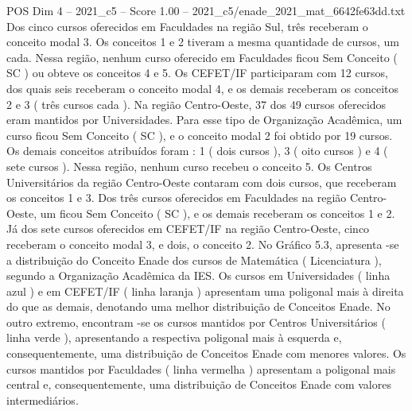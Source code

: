 \begin{textsample}{POS Dim 4 – 2021\_c5 – Score 1.00 – 2021\_c5/enade\_2021\_mat\_6642fe63dd.txt}
Dos cinco cursos oferecidos em Faculdades na região Sul, três receberam o conceito modal 3.
Os conceitos 1 e 2 tiveram a mesma quantidade de cursos, um cada.
Nessa região, nenhum curso oferecido em Faculdades ficou Sem Conceito ( SC ) ou obteve os conceitos 4 e 5.
Os CEFET/IF participaram com 12 cursos, dos quais seis receberam o conceito modal 4, e os demais receberam os conceitos 2 e 3 ( três cursos cada ).
Na região Centro-Oeste, 37 dos 49 cursos oferecidos eram mantidos por Universidades.
Para esse tipo de Organização Acadêmica, um curso ficou Sem Conceito ( SC ), e o conceito modal 2 foi obtido por 19 cursos.
Os demais conceitos atribuídos foram : 1 ( dois cursos ), 3 ( oito cursos ) e 4 ( sete cursos ).
Nessa região, nenhum curso recebeu o conceito 5.
Os Centros Universitários da região Centro-Oeste contaram com dois cursos, que receberam os conceitos 1 e 3.
Dos três cursos oferecidos em Faculdades na região Centro-Oeste, um ficou Sem Conceito ( SC ), e os demais receberam os conceitos 1 e 2.
Já dos sete cursos oferecidos em CEFET/IF na região Centro-Oeste, cinco receberam o conceito modal 3, e dois, o conceito 2.
No Gráfico 5.3, apresenta -se a distribuição do Conceito Enade dos cursos de Matemática ( Licenciatura ), segundo a Organização Acadêmica da IES.
Os cursos em Universidades ( linha azul ) e em CEFET/IF ( linha laranja ) apresentam uma poligonal mais à direita do que as demais, denotando uma melhor distribuição de Conceitos Enade.
No outro extremo, encontram -se os cursos mantidos por Centros Universitários ( linha verde ), apresentando a respectiva poligonal mais à esquerda e, consequentemente, uma distribuição de Conceitos Enade com menores valores.
Os cursos mantidos por Faculdades ( linha vermelha ) apresentam a poligonal mais central e, consequentemente, uma distribuição de Conceitos Enade com valores intermediários.

\end{textsample}
